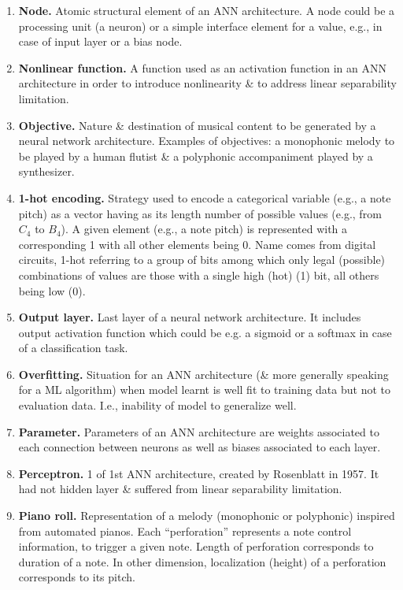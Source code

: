 \documentclass{article}
\begin{document}
\begin{itemize}
\begin{enumerate}
		\item {\bf Node.} Atomic structural element of an ANN architecture. A node could be a processing unit (a neuron) or a simple interface element for a value, e.g., in case of input layer or a bias node.
		\item {\bf Nonlinear function.} A function used as an activation function in an ANN architecture in order to introduce nonlinearity \& to address linear separability limitation.
		\item {\bf Objective.} Nature \& destination of musical content to be generated by a neural network architecture. Examples of objectives: a monophonic melody to be played by a human flutist \& a polyphonic accompaniment played by a synthesizer.
		\item {\bf1-hot encoding.} Strategy used to encode a categorical variable (e.g., a note pitch) as a vector having as its length number of possible values (e.g., from $C_4$ to $B_4$). A given element (e.g., a note pitch) is represented with a corresponding 1 with all other elements being 0. Name comes from digital circuits, 1-hot referring to a group of bits among which only legal (possible) combinations of values are those with a single high (hot) (1) bit, all others being low (0).
		\item {\bf Output layer.} Last layer of a neural network architecture. It includes output activation function which could be e.g. a sigmoid or a softmax in case of a classification task.
		\item {\bf Overfitting.} Situation for an ANN architecture (\& more generally speaking for a ML algorithm) when model learnt is well fit to training data but not to evaluation data. I.e., inability of model to generalize well.
		\item {\bf Parameter.} Parameters of an ANN architecture are weights associated to each connection between neurons as well as biases associated to each layer.
		\item {\bf Perceptron.} 1 of 1st ANN architecture, created by {\sc Rosenblatt} in 1957. It had not hidden layer \& suffered from linear separability limitation.
		\item {\bf Piano roll.} Representation of a melody (monophonic or polyphonic) inspired from automated pianos. Each ``perforation'' represents a note control information, to trigger a given note. Length of perforation corresponds to duration of a note. In other dimension, localization (height) of a perforation corresponds to its pitch.
		

\end{enumerate}
\end{itemize}
\end{document}
